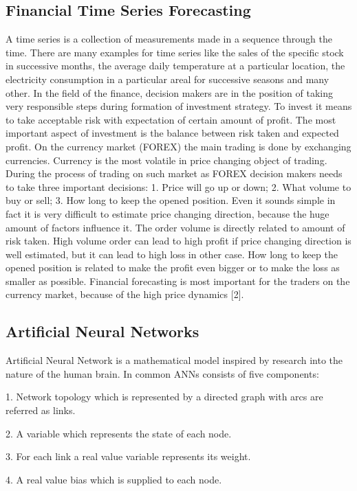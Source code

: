 \documentclass{llncs}
\begin{document}
\subsection{Financial Time Series Forecasting}
%
A time series is a collection of measurements made in a sequence through the time. There are many examples for time series like the sales of the specific stock in successive months, the average daily temperature at a particular location, the electricity consumption in a particular areal for successive seasons and many other. In the field of the finance, decision makers are in the position of taking very responsible steps during formation of investment strategy. To invest it means to take acceptable risk with expectation of certain amount of profit. The most important aspect of investment is the balance between risk taken and expected profit. On the currency market (FOREX) the main trading is done by exchanging currencies. Currency is the most volatile in price changing object of trading. During the process of trading on such market as FOREX decision makers needs to take three important decisions: 1. Price will go up or down; 2. What volume to buy or sell; 3. How long to keep the opened position. Even it sounds simple in fact it is very difficult to estimate price changing direction, because the huge amount of factors influence it. The order volume is directly related to amount of risk taken. High volume order can lead to high profit if price changing direction is well estimated, but it can lead to high loss in other case. How long to keep the opened position is related to make the profit even bigger or to make the loss as smaller as possible. Financial forecasting is most important for the traders on the currency market, because of the high price dynamics [2].
%
\subsection{Artificial Neural Networks}
%
Artificial Neural Network is a mathematical model inspired by research into the nature of the human brain. In common ANNs consists of five components: 

1. Network topology which is represented by a directed graph with arcs are referred as links.

2. A variable which represents the state of each node.

3. For each link a real value variable represents its weight.

4. A real value bias which is supplied to each node.
\end{document}
